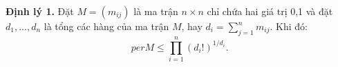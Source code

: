 \documentclass[a4paper, 12pt]{report}
\begin{document}
%
%
%





\textbf{Định lý 1.}  Đặt $M = (m_{ij})$ là ma trận $n \times n$ chỉ chứa hai giá trị 0,1 và đặt $d_{1},...,d_{n}$  là tổng các hàng của ma trận $M$, hay $d_{i} =  \displaystyle \sum _{j=1}^{n}m_{ij}$. Khi đó:
\begin{equation*}
    per M \leq \prod_{i=1}^{n}(d_{i}!)^{1/d_{i}}.
\end{equation*}
\end{document}
